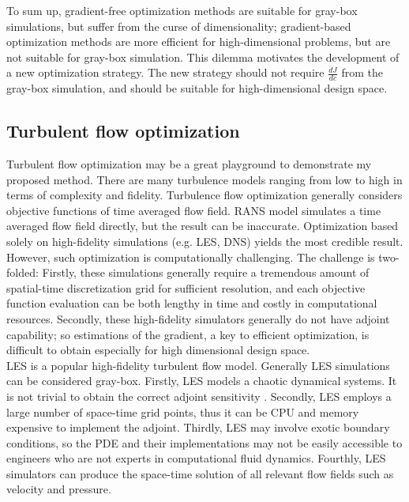 \documentclass[a4paper,onecolumn]{article}
\theoremstyle{remark}
\begin{document}
\noindent To sum up, gradient-free optimization methods are suitable for gray-box simulations, but suffer from the curse of
dimensionality; gradient-based optimization methods are more efficient for high-dimensional problems, but are not suitable for 
gray-box simulation. This dilemma motivates the development of a new optimization strategy. 
The new strategy should not require $\frac{dJ}{dc}$ from the gray-box simulation, 
and should be suitable for high-dimensional design space.\\

\subsection{Turbulent flow optimization}
\noindent Turbulent flow optimization may be a great playground to demonstrate
my proposed method.
There are many turbulence models ranging from low to high in terms of complexity and fidelity. 
Turbulence flow optimization generally considers objective functions of time averaged flow field. RANS model simulates a time averaged flow field directly, but the result can be inaccurate. Optimization based solely on high-fidelity simulations (e.g. LES, DNS) yields the most credible result. However, such optimization is computationally challenging. The challenge is two-folded: Firstly, these simulations generally require a tremendous amount of spatial-time discretization grid for sufficient resolution, and each objective function evaluation can be both lengthy in time and costly in computational resources. Secondly, these high-fidelity simulators generally do not have adjoint capability; so estimations of the gradient, a key to efficient optimization, is difficult to obtain especially for high dimensional design space.\\

\noindent LES is a popular high-fidelity turbulent flow model. Generally LES simulations 
can be considered gray-box. 
Firstly, LES models a chaotic dynamical systems. 
It is not trivial to obtain the correct adjoint sensitivity \cite{chaotic Qiqi}.
Secondly, LES employs a large number of space-time grid points, thus it can be CPU and memory
expensive to implement the adjoint.
Thirdly, LES may involve exotic boundary conditions, so the PDE and their implementations
may not be easily accessible
to engineers who are not experts in computational fluid dynamics.
Fourthly, LES simulators can produce the space-time solution of all relevant flow fields
such as velocity and pressure.\\
\end{document}
